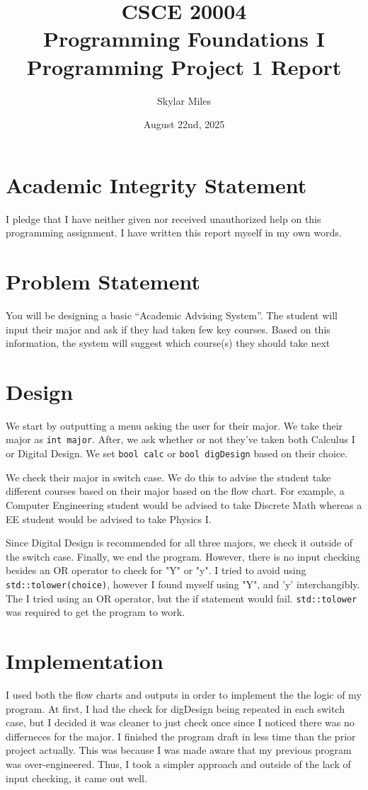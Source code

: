 \documentclass[12pt, letterpaper]{article}
\title{\vspace{-1in}CSCE 20004 \\ Programming Foundations I \\ Programming Project 1 Report}
\author{Skylar Miles}
\date{August 22nd, 2025}
\begin{document}
\maketitle

\section*{Academic Integrity Statement}
I pledge that I have neither given nor received unauthorized help on this programming assignment. I have written this report myself in my own words.

\section{Problem Statement}
You will be designing a basic “Academic Advising System”. The student will input their major and ask if they had taken few key courses. Based on this information, the system will suggest which course(s) they should take next
\section{Design}

We start by outputting a menu asking the user for their major. We take their major as \texttt{int major}. After, we ask whether or not they've taken both Calculus I or Digital Design. We set \texttt{bool calc} or \texttt{bool digDesign} based on their choice. 

We check their major in switch case. We do this to advise the student take different courses based on their major based on the flow chart. For example, a Computer Engineering student would be advised to take Discrete Math whereas a EE student would be advised to take Physics I.

Since Digital Design is recommended for all three majors, we check it outside of the switch case. Finally, we end the program. However, there is no input checking besides an OR operator to check for "Y" or "y". I tried to avoid using \texttt{std::tolower(choice)}, however I found myself using "Y", and 'y' interchangibly. The I tried using an OR operator, but the if statement would fail. \texttt{std::tolower} was required to get the program to work. 
\section{Implementation}
I used both the flow charts and outputs in order to implement the the logic of my program. At first, I had the check for digDesign being repeated in each switch case, but I decided it was cleaner to just check once since I noticed there was no differneces for the major. I finished the program draft in less time than the prior project actually. This was because I was made aware that my previous program was over-engineered. Thus, I took a simpler approach and outside of the lack of input checking, it came out well.
\end{document}
